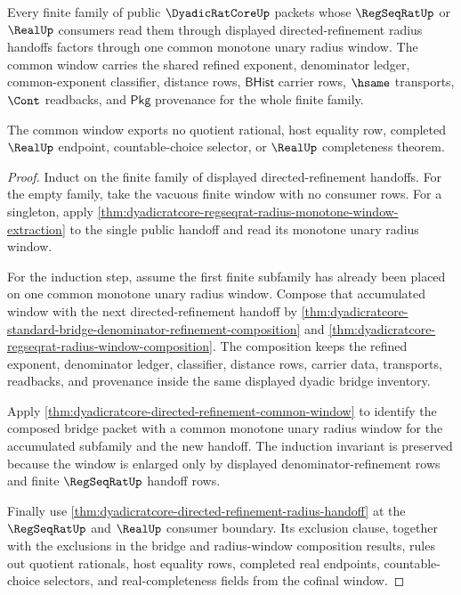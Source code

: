 \begin{theorem}
\label{thm:dyadicratcore-finite-radius-window-cofinality}
Every finite family of public $\DyadicRatCoreUp$ packets whose $\RegSeqRatUp$
or $\RealUp$ consumers read them through displayed directed-refinement radius
handoffs factors through one common monotone unary radius window. The common
window carries the shared refined exponent, denominator ledger, common-exponent
classifier, distance rows, $\mathsf{BHist}$ carrier rows, $\hsame$ transports,
$\Cont$ readbacks, and $\mathsf{Pkg}$ provenance for the whole finite family.

The common window exports no quotient rational, host equality row, completed
$\RealUp$ endpoint, countable-choice selector, or $\RealUp$ completeness theorem.
\end{theorem}
\begin{proof}
Induct on the finite family of displayed directed-refinement handoffs. For the
empty family, take the vacuous finite window with no consumer rows. For a
singleton, apply
\autoref{thm:dyadicratcore-regseqrat-radius-monotone-window-extraction} to the
single public handoff and read its monotone unary radius window.

For the induction step, assume the first finite subfamily has already been
placed on one common monotone unary radius window. Compose that accumulated
window with the next directed-refinement handoff by
\autoref{thm:dyadicratcore-standard-bridge-denominator-refinement-composition}
and \autoref{thm:dyadicratcore-regseqrat-radius-window-composition}. The
composition keeps the refined exponent, denominator ledger, classifier,
distance rows, carrier data, transports, readbacks, and provenance inside the
same displayed dyadic bridge inventory.

Apply \autoref{thm:dyadicratcore-directed-refinement-common-window} to identify
the composed bridge packet with a common monotone unary radius window for the
accumulated subfamily and the new handoff. The induction invariant is preserved
because the window is enlarged only by displayed denominator-refinement rows and
finite $\RegSeqRatUp$ handoff rows.

Finally use \autoref{thm:dyadicratcore-directed-refinement-radius-handoff} at the
$\RegSeqRatUp$ and $\RealUp$ consumer boundary. Its exclusion clause, together
with the exclusions in the bridge and radius-window composition results, rules
out quotient rationals, host equality rows, completed real endpoints,
countable-choice selectors, and real-completeness fields from the cofinal
window.
\end{proof}

